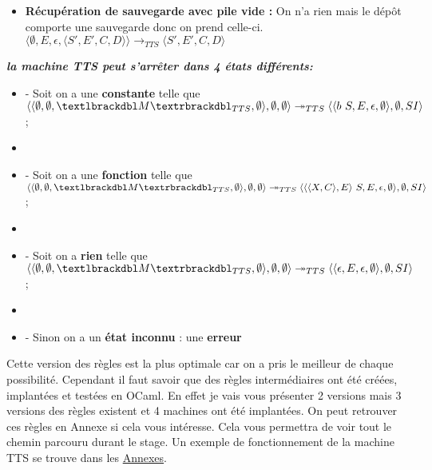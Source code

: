 \documentclass[10pt,a4paper]{report}
\begin{document}
\begin{enumerate}
\begin{itemize}
			\item[] \textbf{Récupération de sauvegarde avec pile vide :}  On n'a rien mais le dépôt comporte une sauvegarde donc on prend celle-ci.
			\smallbreak  
			$\langle \emptyset,E,\epsilon,\langle S',E',C,D\rangle\rangle
			\longrightarrow_{TTS} 
			\langle S',E',C,D\rangle$
		\end{itemize}
	\end{enumerate}
	\bigbreak
	\bigbreak
	
	
	
\textbf{\textit{la machine TTS peut s'arrêter dans 4 états différents:}}
\smallbreak
\begin{itemize}
	\item[] - Soit on a une \textbf{constante} telle que 
	$\langle\langle \emptyset,\emptyset,\textlbrackdbl M\textrbrackdbl_{TTS},\emptyset\rangle,\emptyset,\emptyset\rangle 
	\twoheadrightarrow_{TTS} 
	\langle\langle b~S,E,\epsilon,\emptyset\rangle,\emptyset,SI\rangle$;
	\item[] 
	\item[] - Soit on a une \textbf{fonction} telle que
	$\langle\langle \emptyset,\emptyset,\textlbrackdbl M\textrbrackdbl_{TTS},\emptyset\rangle,\emptyset,\emptyset\rangle 
	\twoheadrightarrow_{TTS} 
	\langle\langle\langle X,C\rangle,E\rangle~S,E,\epsilon,\emptyset\rangle,\emptyset,SI\rangle$;
	\item[]
	\item[] - Soit on a \textbf{rien} telle que
	$\langle\langle \emptyset,\emptyset,\textlbrackdbl M\textrbrackdbl_{TTS},\emptyset\rangle,\emptyset,\emptyset\rangle 
	\twoheadrightarrow_{TTS} 
	\langle\langle\epsilon,E,\epsilon,\emptyset\rangle,\emptyset,SI\rangle$;
	\item[]  
	\item[] - Sinon on a un \textbf{état inconnu} : une \textbf{erreur} 
\end{itemize}
\bigbreak
\bigbreak
	
	
	
	Cette version des règles est la plus optimale car on a pris le meilleur de chaque possibilité. Cependant il faut savoir que des règles intermédiaires ont été créées, implantées et testées en OCaml. En effet je vais vous présenter 2 versions mais 3 versions des règles existent et 4 machines ont été implantées. On peut retrouver ces règles en Annexe si cela vous intéresse. Cela vous permettra de voir tout le chemin parcouru durant le stage. Un exemple de fonctionnement de la machine TTS se trouve dans les \hyperref[TTS]{Annexes}.
	\newpage
	
\end{document}
